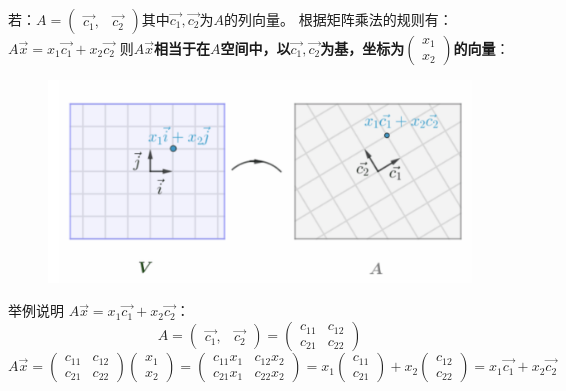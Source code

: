 \documentclass[12pt]{article}
\begin{document}
若：$A=\begin{pmatrix}\vec{c_1},&\vec{c_2}\end{pmatrix}$其中$\vec{c_1},\vec{c_2}$为$A$的列向量。
根据矩阵乘法的规则有：
$A\vec{x}=x_1\vec{c_1}+x_2\vec{c_2}$
则\textbf{$A\vec{x}$相当于在$A$空间中，以$\vec{c_1},\vec{c_2}$为基，坐标为$\begin{pmatrix}x_1\\x_2\end{pmatrix}$的向量}：
\begin{figure}[H]
\centering
\includegraphics[width=.8\textwidth]{fig/UnderstandMatrixMultiplication_6.png}
\end{figure}

\begin{framed}  
\small{
举例说明 $A\vec{x}=x_1\vec{c_1}+x_2\vec{c_2}$：
$$
A = 
\begin{pmatrix}
\vec{c_1},&\vec{c_2}
\end{pmatrix} = 
\begin{pmatrix}
c_{11}&c_{12} \\
c_{21}&c_{22}
\end{pmatrix} 
$$
$$
A\vec{x} = 
\begin{pmatrix}
c_{11}&c_{12} \\
c_{21}&c_{22}
\end{pmatrix} 
\begin{pmatrix}
x_1 \\
x_2
\end{pmatrix} = 
\begin{pmatrix}
c_{11}x_1&c_{12}x_2 \\
c_{21}x_1&c_{22}x_2
\end{pmatrix} = 
x_1\begin{pmatrix}c_{11}\\c_{21}\end{pmatrix} + x_2\begin{pmatrix}c_{12}\\c_{22}\end{pmatrix} = x_1\vec{c_1}+x_2\vec{c_2}
$$
}
\end{framed}
\end{document}
